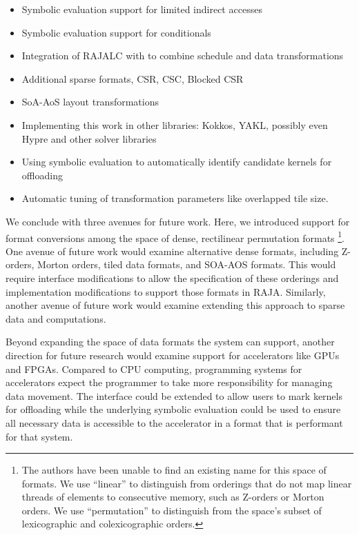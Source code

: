 \begin{itemize}
  \item Symbolic evaluation support for limited indirect accesses
  \item Symbolic evaluation support for conditionals
  \item Integration of RAJALC with \FormatDecisions{} to combine schedule and data transformations
  \item Additional sparse formats, CSR, CSC, Blocked CSR
  \item SoA-AoS layout transformations
  \item Implementing this work in other libraries: Kokkos, YAKL, possibly even Hypre and other solver libraries
  \item Using symbolic evaluation to automatically identify candidate kernels for offloading
  \item Automatic tuning of transformation parameters like overlapped tile size.
\end{itemize}


We conclude with three avenues for future work.
Here, we introduced support for format conversions among the space of dense, rectilinear permutation formats
\footnote{The authors have been unable to find an existing name for this space of formats. We use \enquote{linear} to distinguish from orderings that do not map linear threads of elements to consecutive memory, such as Z-orders or Morton orders. We use \enquote{permutation} to distinguish from the space's subset of lexicographic and colexicographic orders.}. 
One avenue of future work would examine alternative dense formats, including Z-orders, Morton orders, tiled data formats, and SOA-AOS formats.
This would require interface modifications to allow the specification of these orderings and implementation modifications to support those formats in RAJA.
Similarly, another avenue of future work would examine extending this approach to sparse data and computations. 

Beyond expanding the space of data formats the system can support, another direction for future research would examine support for accelerators like GPUs and FPGAs.
Compared to CPU computing, programming systems for accelerators expect the programmer to take more responsibility for managing data movement.
The \FormatDecisions{} interface could be extended to allow users to mark kernels for offloading while the underlying symbolic evaluation could be used to ensure all necessary data is accessible to the accelerator in a format that is performant for that system. 

